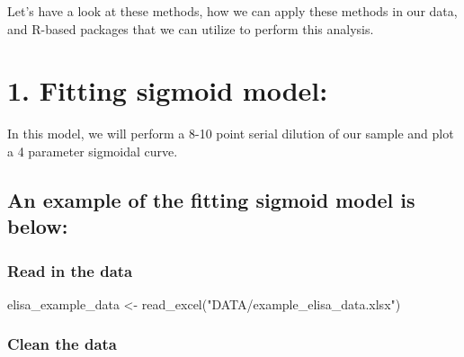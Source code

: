 \documentclass[
]{book}
\newenvironment{Shaded}{\begin{snugshade}}{\end{snugshade}}
\newcommand{\FunctionTok}[1]{\textcolor[rgb]{0.00,0.00,0.00}{#1}}
\newcommand{\NormalTok}[1]{#1}
\newcommand{\OtherTok}[1]{\textcolor[rgb]{0.56,0.35,0.01}{#1}}
\newcommand{\StringTok}[1]{\textcolor[rgb]{0.31,0.60,0.02}{#1}}
\begin{document}
Let's have a look at these methods, how we can apply these methods in our data, and R-based packages that we can utilize to perform this analysis.

\hypertarget{fitting-sigmoid-model}{%
\section{\texorpdfstring{\textbf{1. Fitting sigmoid model:}}{1. Fitting sigmoid model:}}\label{fitting-sigmoid-model}}

In this model, we will perform a 8-10 point serial dilution of our sample and plot a 4 parameter sigmoidal curve.

\hypertarget{an-example-of-the-fitting-sigmoid-model-is-below}{%
\subsection{An example of the fitting sigmoid model is below:}\label{an-example-of-the-fitting-sigmoid-model-is-below}}

\hypertarget{read-in-the-data}{%
\subsubsection{Read in the data}\label{read-in-the-data}}

\begin{Shaded}
\begin{Highlighting}[]
\NormalTok{elisa\_example\_data }\OtherTok{\textless{}{-}} \FunctionTok{read\_excel}\NormalTok{(}\StringTok{"DATA/example\_elisa\_data.xlsx"}\NormalTok{)}
\end{Highlighting}
\end{Shaded}

\hypertarget{clean-the-data}{%
\subsubsection{Clean the data}\label{clean-the-data}}
\end{document}
